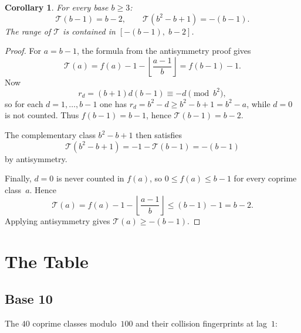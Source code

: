 \documentclass[12pt]{amsart}
\newtheorem{corollary}[theorem]{Corollary}
\theoremstyle{definition}
\theoremstyle{remark}
\begin{document}
\begin{corollary}\label{cor:range}
For every base $b \ge 3$:
\[
\mathcal{T}(b{-}1) = b - 2, \qquad
\mathcal{T}(b^2 - b + 1) = -(b-1).
\]
The range of $\mathcal{T}$ is contained in
$[-(b{-}1),\; b{-}2]$.
\end{corollary}

\begin{proof}
For $a=b-1$, the formula from the antisymmetry proof gives
\[
\mathcal T(a)=f(a)-1-\left\lfloor \frac{a-1}{b}\right\rfloor
=f(b-1)-1.
\]
Now
\[
r_d=(b+1)d(b-1)\equiv -d \pmod{b^2},
\]
so for each $d=1,\dots,b-1$ one has
$r_d=b^2-d \ge b^2-b+1 = b^2-a$, while $d=0$ is not
counted. Thus $f(b-1)=b-1$, hence
$\mathcal T(b-1)=b-2$.

The complementary class $b^2-b+1$ then satisfies
\[
\mathcal T(b^2-b+1)=-1-\mathcal T(b-1)=-(b-1)
\]
by antisymmetry.

Finally, $d=0$ is never counted in $f(a)$, so
$0\le f(a)\le b-1$ for every coprime class~$a$. Hence
\[
\mathcal T(a)=f(a)-1-\left\lfloor \frac{a-1}{b}\right\rfloor
\le (b-1)-1=b-2.
\]
Applying antisymmetry gives
$\mathcal T(a)\ge -(b-1)$.
\end{proof}

\section{The Table}

\subsection*{Base 10}

The $40$ coprime classes modulo~$100$ and their collision
fingerprints at lag~$1$:
\end{document}
